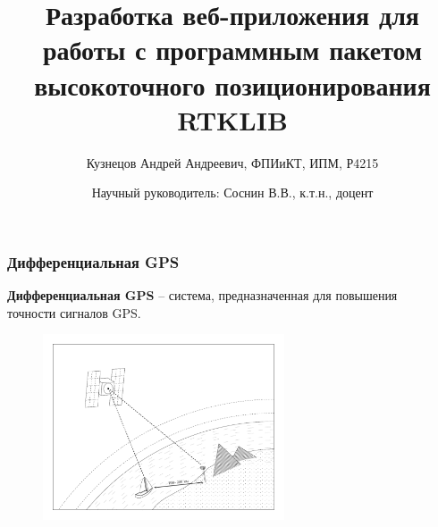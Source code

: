 \documentclass[xetex,с,aspectratio=169]{beamer}
\title{Разработка веб-приложения для работы с программным пакетом высокоточного позиционирования RTKLIB}
\author[Кузнецов А.А., P3410]{Кузнецов Андрей Андреевич, ФПИиКТ, ИПМ, Р4215}
\date[]{Научный руководитель: Соснин В.В., к.т.н., доцент}
\begin{document}
%
%
{
  \begin{frame}
    \titlepage
  \end{frame}
}


%
%
\begin{frame}
  \frametitle{Дифференциальная GPS}

  \begin{center}
    \textbf{Дифференциальная GPS} -- система, предназначенная для повышения\\точности сигналов GPS.
  \end{center}

  \vskip -0.25cm

  \begin{figure}[h]
    \centering
    \includegraphics[height=5.5cm]{../img/tikz/dgps-one/pic}
  \end{figure}
\end{frame}
\end{document}
